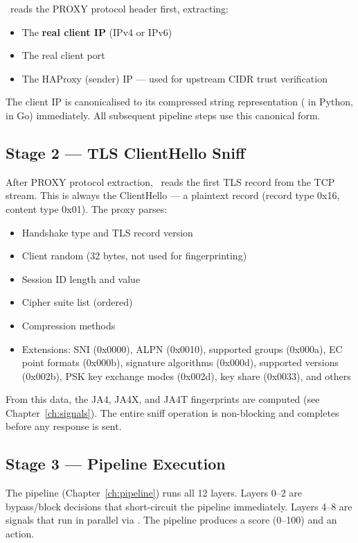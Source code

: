 \ja\ reads the PROXY protocol header first, extracting:
\begin{itemize}
  \item The \textbf{real client IP} (IPv4 or IPv6)
  \item The real client port
  \item The HAProxy (sender) IP — used for upstream CIDR trust verification
\end{itemize}

The client IP is canonicalised to its compressed string representation
( in Python,  in Go)
immediately. All subsequent pipeline steps use this canonical form.

\subsection{Stage 2 — TLS ClientHello Sniff}

After PROXY protocol extraction, \ja\ reads the first TLS record from the TCP stream.
This is always the ClientHello — a plaintext record (record type 0x16, content type 0x01).
The proxy parses:

\begin{itemize}
  \item Handshake type and TLS record version
  \item Client random (32 bytes, not used for fingerprinting)
  \item Session ID length and value
  \item Cipher suite list (ordered)
  \item Compression methods
  \item Extensions: SNI (0x0000), ALPN (0x0010), supported groups (0x000a),
        EC point formats (0x000b), signature algorithms (0x000d),
        supported versions (0x002b), PSK key exchange modes (0x002d),
        key share (0x0033), and others
\end{itemize}

From this data, the JA4, JA4X, and JA4T fingerprints are computed (see
Chapter~\ref{ch:signals}). The entire sniff operation is non-blocking and completes
before any response is sent.

\subsection{Stage 3 — Pipeline Execution}

The pipeline (Chapter~\ref{ch:pipeline}) runs all 12 layers. Layers 0–2 are
bypass/block decisions that short-circuit the pipeline immediately. Layers 4–8 are
signals that run in parallel via . The pipeline produces a
score (0–100) and an action.

